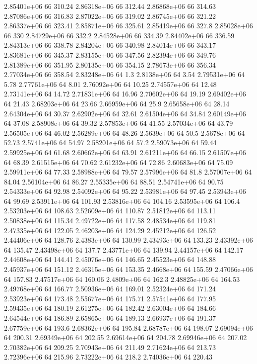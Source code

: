 2.85401e+06 66 310.24
2.86318e+06 66 312.44
2.86868e+06 66 314.63
2.87086e+06 66 316.83
2.87022e+06 66 319.02
2.86745e+06 66 321.22
2.86337e+06 66 323.41
2.85871e+06 66 325.61
2.85419e+06 66 327.8
2.85028e+06 66 330
2.84729e+06 66 332.2
2.84528e+06 66 334.39
2.84402e+06 66 336.59
2.84313e+06 66 338.78
2.84204e+06 66 340.98
2.84014e+06 66 343.17
2.83681e+06 66 345.37
2.83155e+06 66 347.56
2.82394e+06 66 349.76
2.81389e+06 66 351.95
2.80135e+06 66 354.15
2.78673e+06 66 356.34
2.77034e+06 66 358.54
2.83248e+06 64 1.3
2.8138e+06 64 3.54
2.79531e+06 64 5.78
2.77761e+06 64 8.01
2.76092e+06 64 10.25
2.74557e+06 64 12.48
2.73141e+06 64 14.72
2.71831e+06 64 16.96
2.70602e+06 64 19.19
2.69402e+06 64 21.43
2.68203e+06 64 23.66
2.66959e+06 64 25.9
2.65658e+06 64 28.14
2.64304e+06 64 30.37
2.62902e+06 64 32.61
2.61504e+06 64 34.84
2.60149e+06 64 37.08
2.58908e+06 64 39.32
2.57853e+06 64 41.55
2.57034e+06 64 43.79
2.56505e+06 64 46.02
2.56289e+06 64 48.26
2.5639e+06 64 50.5
2.5678e+06 64 52.73
2.5741e+06 64 54.97
2.58201e+06 64 57.2
2.59073e+06 64 59.44
2.59925e+06 64 61.68
2.60662e+06 64 63.91
2.61211e+06 64 66.15
2.61507e+06 64 68.39
2.61515e+06 64 70.62
2.61232e+06 64 72.86
2.60683e+06 64 75.09
2.59911e+06 64 77.33
2.58988e+06 64 79.57
2.57996e+06 64 81.8
2.57007e+06 64 84.04
2.56104e+06 64 86.27
2.55335e+06 64 88.51
2.54741e+06 64 90.75
2.54333e+06 64 92.98
2.54092e+06 64 95.22
2.53981e+06 64 97.45
2.53943e+06 64 99.69
2.53911e+06 64 101.93
2.53816e+06 64 104.16
2.53595e+06 64 106.4
2.53203e+06 64 108.63
2.52609e+06 64 110.87
2.51812e+06 64 113.11
2.50838e+06 64 115.34
2.49722e+06 64 117.58
2.48534e+06 64 119.81
2.47335e+06 64 122.05
2.46203e+06 64 124.29
2.45212e+06 64 126.52
2.44406e+06 64 128.76
2.4383e+06 64 130.99
2.43493e+06 64 133.23
2.43392e+06 64 135.47
2.43498e+06 64 137.7
2.43771e+06 64 139.94
2.44157e+06 64 142.17
2.44608e+06 64 144.41
2.45076e+06 64 146.65
2.45523e+06 64 148.88
2.45937e+06 64 151.12
2.46315e+06 64 153.35
2.4668e+06 64 155.59
2.47066e+06 64 157.83
2.47517e+06 64 160.06
2.4809e+06 64 162.3
2.48825e+06 64 164.53
2.49768e+06 64 166.77
2.50936e+06 64 169.01
2.52324e+06 64 171.24
2.53923e+06 64 173.48
2.55677e+06 64 175.71
2.57541e+06 64 177.95
2.59435e+06 64 180.19
2.61275e+06 64 182.42
2.63004e+06 64 184.66
2.64544e+06 64 186.89
2.65865e+06 64 189.13
2.66937e+06 64 191.37
2.67759e+06 64 193.6
2.68362e+06 64 195.84
2.68787e+06 64 198.07
2.69094e+06 64 200.31
2.69349e+06 64 202.55
2.69614e+06 64 204.78
2.69946e+06 64 207.02
2.70382e+06 64 209.25
2.70943e+06 64 211.49
2.71624e+06 64 213.73
2.72396e+06 64 215.96
2.73222e+06 64 218.2
2.74036e+06 64 220.43

